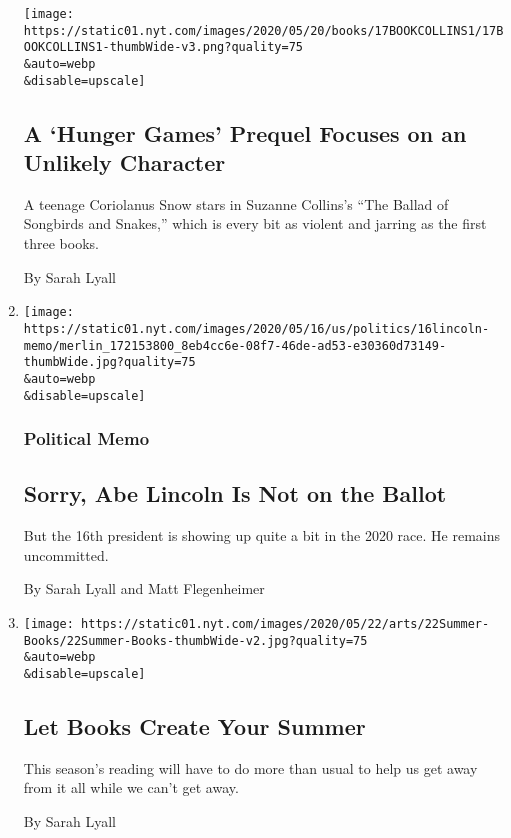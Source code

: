 \begin{enumerate}
  \texttt{[image: https://static01.nyt.com/images/2020/05/20/books/17BOOKCOLLINS1/17BOOKCOLLINS1-thumbWide-v3.png?quality=75\\\&auto=webp\\\&disable=upscale]}

  \hypertarget{a-hunger-games-prequel-focuses-on-an-unlikely-character}{%
  \subsection{A `Hunger Games' Prequel Focuses on an Unlikely
  Character}\label{a-hunger-games-prequel-focuses-on-an-unlikely-character}}

  A teenage Coriolanus Snow stars in Suzanne Collins's ``The Ballad of
  Songbirds and Snakes,'' which is every bit as violent and jarring as
  the first three books.

  By Sarah Lyall
\item
  \href{/2020/05/16/us/politics/abraham-lincoln-trump-biden.html}{}

  \texttt{[image: https://static01.nyt.com/images/2020/05/16/us/politics/16lincoln-memo/merlin\_172153800\_8eb4cc6e-08f7-46de-ad53-e30360d73149-thumbWide.jpg?quality=75\\\&auto=webp\\\&disable=upscale]}

  \hypertarget{political-memo}{%
  \subsubsection{Political Memo}\label{political-memo}}

  \hypertarget{sorry-abe-lincoln-is-not-on-the-ballot}{%
  \subsection{Sorry, Abe Lincoln Is Not on the
  Ballot}\label{sorry-abe-lincoln-is-not-on-the-ballot}}

  But the 16th president is showing up quite a bit in the 2020 race. He
  remains uncommitted.

  By Sarah Lyall and Matt Flegenheimer
\item
  \href{/2020/05/13/books/summer-what-to-read.html}{}

  \texttt{[image: https://static01.nyt.com/images/2020/05/22/arts/22Summer-Books/22Summer-Books-thumbWide-v2.jpg?quality=75\\\&auto=webp\\\&disable=upscale]}

  \hypertarget{let-books-create-your-summer}{%
  \subsection{Let Books Create Your
  Summer}\label{let-books-create-your-summer}}

  This season's reading will have to do more than usual to help us get
  away from it all while we can't get away.

  By Sarah Lyall
\end{enumerate}

